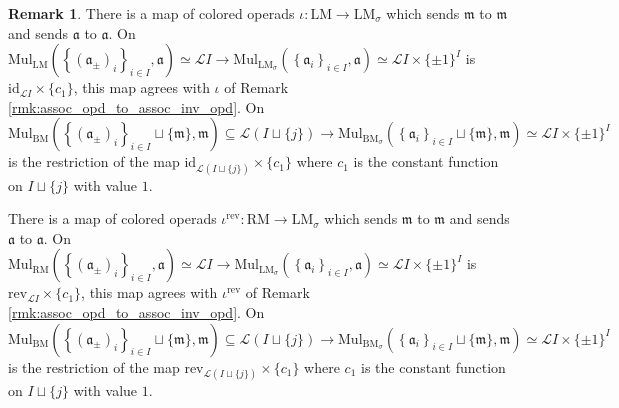 \documentclass{article}
\theoremstyle{definition}
\newtheorem{remark}[theorem]{Remark}
\begin{document}
\begin{remark}\label{rmk:lmod_opd_to_inv_lmod_opd}
    There is a map of colored operads $ \iota \colon \mathrm{LM} \to \mathrm{LM}_{\sigma} $ which sends $ \mathfrak{m} $ to $ \mathfrak{m} $ and sends $ \mathfrak{a} $ to $ \mathfrak{a} $. 
    On $ \mathrm{Mul}_{\mathrm{LM}}\left(\left\{(\mathfrak{a}_{\pm})_i\right\}_{i \in I}, \mathfrak{a}\right) \simeq  \mathcal{L}I \to \mathrm{Mul}_{\mathrm{LM}_\sigma}\left(\left\{\mathfrak{a}_i\right\}_{i \in I}, \mathfrak{a}\right) \simeq  \mathcal{L}I \times \{\pm 1\}^I $  is $ \mathrm{id}_{\mathcal{L}I} \times \{ c_1\} $, this map agrees with $ \iota $ of Remark \ref{rmk:assoc_opd_to_assoc_inv_opd}. 
    On $ \mathrm{Mul}_{\mathrm{BM}}\left(\left\{(\mathfrak{a}_{\pm})_i\right\}_{i \in I} \sqcup\{\mathfrak{m}\}, \mathfrak{m}\right) \subseteq  \mathcal{L}(I\sqcup \{j\}) \to \mathrm{Mul}_{\mathrm{BM}_\sigma}\left(\left\{\mathfrak{a}_i\right\}_{i \in I} \sqcup \{\mathfrak{m}\}, \mathfrak{m}\right) \simeq  \mathcal{L}I \times \{\pm 1\}^I $ is the restriction of the map $ \mathrm{id}_{\mathcal{L}(I\sqcup \{j\})} \times \{ c_1\} $ where $ c_1 $ is the constant function on $ I \sqcup \{j\} $ with value $ 1 $. 

    There is a map of colored operads $ \iota^{\mathrm{rev}} \colon \mathrm{RM} \to \mathrm{LM}_{\sigma} $ which sends $ \mathfrak{m} $ to $ \mathfrak{m} $ and sends $ \mathfrak{a} $ to $ \mathfrak{a} $. 
    On $ \mathrm{Mul}_{\mathrm{RM}}\left(\left\{(\mathfrak{a}_{\pm})_i\right\}_{i \in I}, \mathfrak{a}\right) \simeq  \mathcal{L}I \to \mathrm{Mul}_{\mathrm{LM}_\sigma}\left(\left\{\mathfrak{a}_i\right\}_{i \in I}, \mathfrak{a}\right) \simeq  \mathcal{L}I \times \{\pm 1\}^I $  is $ \mathrm{rev}_{\mathcal{L}I} \times \{ c_{1}\} $, this map agrees with $ \iota^{\mathrm{rev}} $ of Remark \ref{rmk:assoc_opd_to_assoc_inv_opd}. 
    On $ \mathrm{Mul}_{\mathrm{BM}}\left(\left\{(\mathfrak{a}_{\pm})_i\right\}_{i \in I} \sqcup\{\mathfrak{m}\}, \mathfrak{m}\right) \subseteq  \mathcal{L}(I\sqcup \{j\}) \to \mathrm{Mul}_{\mathrm{BM}_\sigma}\left(\left\{\mathfrak{a}_i\right\}_{i \in I} \sqcup \{\mathfrak{m}\}, \mathfrak{m}\right) \simeq  \mathcal{L}I \times \{\pm 1\}^I $ is the restriction of the map $ \mathrm{rev}_{\mathcal{L}(I\sqcup \{j\})} \times \{ c_1\} $ where $ c_1 $ is the constant function on $ I \sqcup \{j\} $ with value $ 1 $. 
\end{remark}
\end{document}
